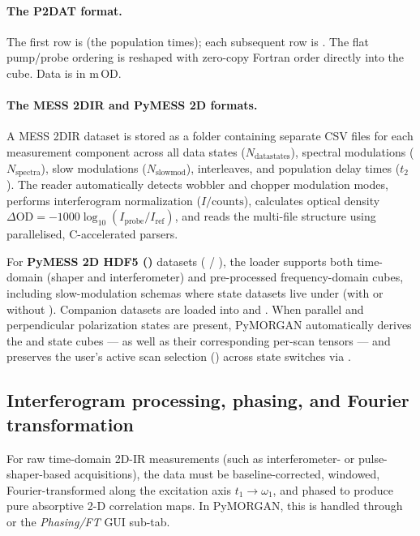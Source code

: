 \paragraph{The P2DAT format.}
The first row is  (the population
times); each subsequent row is . The
flat pump/probe ordering is reshaped with zero-copy Fortran order directly into the
 cube. Data is in m\,OD.

\paragraph{The MESS 2DIR and PyMESS 2D formats.}
A MESS 2DIR dataset is stored as a folder containing separate CSV files for each measurement component across all data states ($N_{\text{datastates}}$), spectral modulations ($N_{\text{spectra}}$), slow modulations ($N_{\text{slowmod}}$), interleaves, and population delay times ($t_2$). The reader automatically detects wobbler and chopper modulation modes, performs interferogram normalization ($I / \text{counts}$), calculates optical density $\Delta\mathrm{OD} = -1000 \log_{10}(I_{\text{probe}} / I_{\text{ref}})$, and reads the multi-file structure using parallelised, C-accelerated parsers.

For \textbf{PyMESS 2D HDF5 ()} datasets ( / ), the loader supports both time-domain (shaper and interferometer) and pre-processed frequency-domain cubes, including slow-modulation schemas where state datasets live under  (with or without ). Companion  datasets are loaded into  and . When parallel and perpendicular polarization states are present, PyMORGAN automatically derives the  and  state cubes — as well as their corresponding per-scan tensors — and preserves the user's active scan selection () across state switches via .

\subsection{Interferogram processing, phasing, and Fourier transformation}\label{sec:twoD:processing}

For raw time-domain 2D-IR measurements (such as interferometer- or pulse-shaper-based acquisitions), the data must be baseline-corrected, windowed, Fourier-transformed along the excitation axis $t_1 \to \omega_1$, and phased to produce pure absorptive 2-D correlation maps. In PyMORGAN, this is handled through  or the \emph{Phasing/FT} GUI sub-tab.

